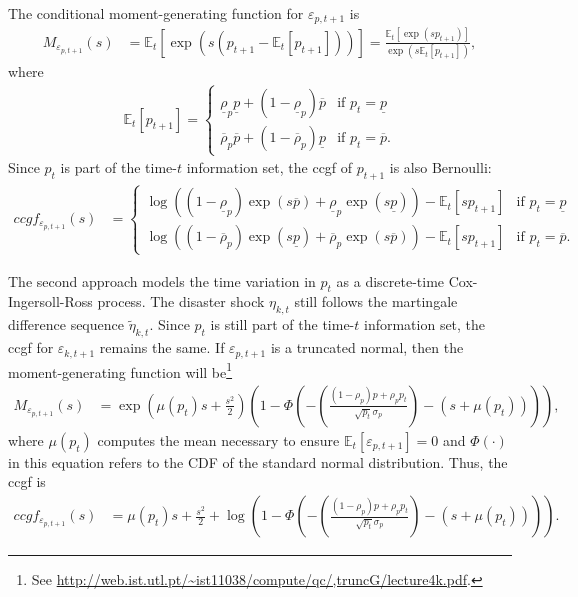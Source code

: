 \documentclass[12 pt, oneside]{article}
\theoremstyle{definition}
\theoremstyle{definition}
\theoremstyle{definition}
\newcommand{\E}{\mathbb{E}}
\begin{document}
The conditional moment-generating function for $\varepsilon_{p, t + 1}$ is
\begin{align*}
  M_{\varepsilon_{p, t + 1}}(s) & = \E_t[\exp(s (p_{t + 1} - \E_t[p_{t + 1}]))] = \frac{\E_t[\exp(s p_{t + 1})]}{\exp(s\E_t[p_{t + 1}])},
\end{align*}
where
\begin{align}
  \E_t[p_{t + 1}] =
  \begin{cases}
    \underline{\rho}_p \underline{p} + (1 - \underline{\rho}_p) \overline{p} & \text{if } p_t = \underline{p}\\
    \overline{\rho}_p \overline{p} + (1 - \overline{\rho}_p) \underline{p} & \text{if } p_t = \overline{p}.
  \end{cases}
\end{align}
Since $p_t$ is part of the time-$t$ information set, the ccgf of $p_{t + 1}$ is also Bernoulli:
\begin{align}\label{eq:ccgf bernoulli disaster probability}
  ccgf_{\varepsilon_{p, t + 1}}(s) & =
                                     \begin{cases}
                                       \log((1 - \underline{\rho}_p) \exp(s \overline{p}) + \underline{\rho}_p\exp(s \underline{p}))  - \E_t[s p_{t + 1}] & \text{if } p_t = \underline{p}\\
                                       \log((1 - \overline{\rho}_p) \exp(s \underline{p}) + \overline{\rho}_p\exp(s \overline{p}))  - \E_t[s p_{t + 1}] & \text{if } p_t = \overline{p}.
                                     \end{cases}
\end{align}


The second approach models the time variation in $p_t$ as a discrete-time Cox-Ingersoll-Ross process. The disaster shock $\eta_{k, t}$ still follows the martingale difference sequence $\tilde{\eta}_{k, t}$. Since $p_t$ is still part of the time-$t$ information set, the ccgf for $\varepsilon_{k, t + 1}$ remains the same. If $\varepsilon_{p, t + 1}$ is a truncated normal, then the moment-generating function will be\footnote{See \url{http://web.ist.utl.pt/~ist11038/compute/qc/,truncG/lecture4k.pdf}.}
\begin{align*}
  M_{\varepsilon_{p, t + 1}}(s) & = \exp\left( \mu(p_t) s + \frac{s^2}{2}\right)\left(1 - \Phi\left(-\left(\frac{(1 - \rho_p)p + \rho_p p_t}{\sqrt{p_t} \sigma_p}\right) - (s + \mu(p_t))\right)\right),
\end{align*}
where $\mu(p_t)$ computes the mean necessary to ensure $\E_t[\varepsilon_{p, t + 1}] = 0$ and $\Phi(\cdot)$ in this equation refers to the CDF of the standard normal distribution. Thus, the ccgf is
\begin{align}
  ccgf_{\varepsilon_{p, t + 1}}(s) & =  \mu(p_t) s + \frac{s^2}{2} + \log\left(1 - \Phi\left(-\left(\frac{(1 - \rho_p)p + \rho_p p_t}{\sqrt{p_t} \sigma_p}\right) - (s + \mu(p_t))\right)\right).
\end{align}
\end{document}
